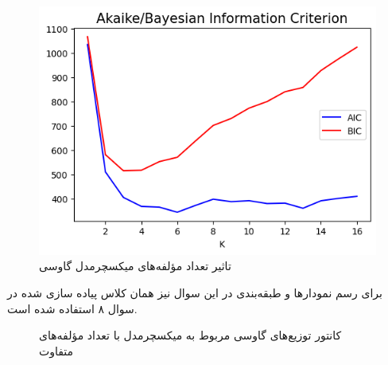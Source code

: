 \documentclass[12pt,onecolumn,a4paper]{article}
\begin{document}
\begin{figure}[h!]
    \label{fig:5}
    \begin{center}
    \includegraphics[scale=0.6]{q10_aicbic.png}
    \caption{تاثیر تعداد مؤلفه‌های میکسچرمدل گاوسی}
    \end{center}
\end{figure}

برای رسم نمودارها و طبقه‌بندی در این سوال نیز همان کلاس پیاده سازی شده در سوال ۸ استفاده شده است. 

\begin{figure}[h]
    \centering
    \caption{کانتور توزیع‌های گاوسی مربوط به میکسچرمدل با تعداد مؤلفه‌های متفاوت}
    \label{fig:7}
\end{figure}
\end{document}
